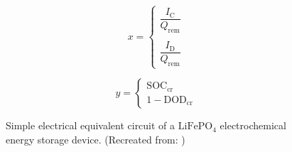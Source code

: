 \begin{center}
	\begin{equation} \label{eq:battery_x}
		x =
  		\begin{cases}
   			\dfrac{I_\mathrm{C}}{Q_\mathrm{rem}} \\ \\
			\dfrac{I_\mathrm{D}}{Q_\mathrm{rem}}
  		\end{cases}
	\end{equation} 
\end{center}

\begin{center}
	\begin{equation} \label{eq:battery_y}
		y =
  		\begin{cases}
   			\mathrm{SOC_{cr}} \\
			\mathrm{1 - DOD_{cr}}
  		\end{cases}
	\end{equation} 
\end{center}

\begin{figure}[h!]
	\centering
	
	\caption{Simple electrical equivalent circuit of a $\mathrm{LiFePO}_4$ electrochemical energy storage device. (Recreated from: \cite{})}
	\label{fig:tikz_battery}
\end{figure}
